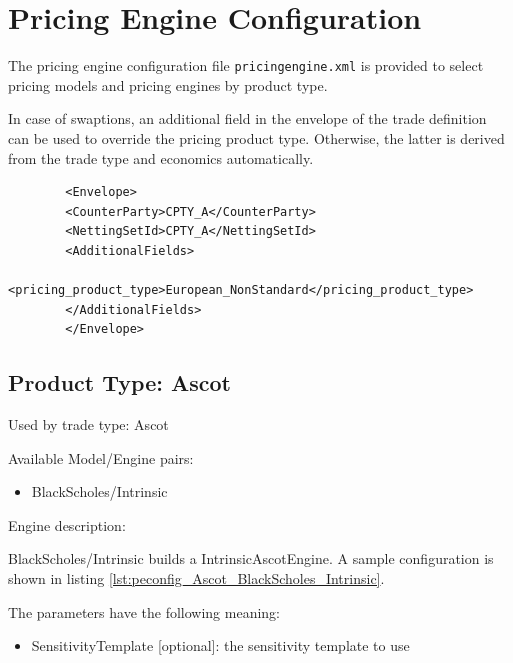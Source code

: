 \section{Pricing Engine Configuration}
\label{sec:configuration_pricingengines}

The pricing engine configuration file {\tt pricingengine.xml} is provided to select pricing models and
pricing engines by product type.

In case of swaptions, an additional field in the envelope of the trade definition can be used to override the pricing product type.
Otherwise, the latter is derived from the trade type and economics automatically.

\begin{longlisting}
    \begin{verbatim}
        <Envelope>
        <CounterParty>CPTY_A</CounterParty>
        <NettingSetId>CPTY_A</NettingSetId>
        <AdditionalFields>
            <pricing_product_type>European_NonStandard</pricing_product_type>
        </AdditionalFields>
        </Envelope>
    \end{verbatim}
    \caption{Explicitly given pricing product type in the envelope.}
\end{longlisting}

\subsection{Product Type: Ascot}

Used by trade type: Ascot

Available Model/Engine pairs:

\begin{itemize}
\item BlackScholes/Intrinsic
\end{itemize}

Engine description:

BlackScholes/Intrinsic builds a IntrinsicAscotEngine. A sample configuration is shown
in listing \ref{lst:peconfig_Ascot_BlackScholes_Intrinsic}.

The parameters have the following meaning:

\begin{itemize}
\item SensitivityTemplate [optional]: the sensitivity template to use
\end{itemize}

